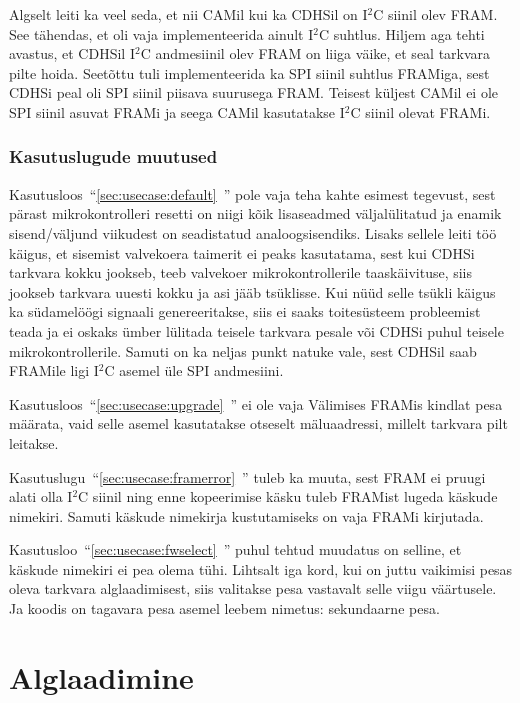 \documentclass[12pt,a4paper]{article}
\newcommand{\iic}{I${}^2$C }
\begin{document}
Algselt leiti ka veel seda, et nii CAMil kui ka CDHSil on \iic siinil olev FRAM.
See tähendas, et oli vaja implementeerida ainult \iic suhtlus. Hiljem aga tehti
avastus, et CDHSil \iic andmesiinil olev FRAM on liiga väike, et seal tarkvara
pilte hoida. Seetõttu tuli implementeerida ka SPI siinil suhtlus FRAMiga, sest
CDHSi peal oli SPI siinil piisava suurusega FRAM. Teisest küljest CAMil ei ole
SPI siinil asuvat FRAMi ja seega CAMil kasutatakse \iic siinil olevat FRAMi.

\subsubsection{Kasutuslugude muutused}
Kasutusloos~``\ref{sec:usecase:default}~'' pole vaja
teha kahte esimest tegevust, sest pärast mikrokontrolleri resetti on niigi kõik
lisaseadmed väljalülitatud ja enamik sisend/väljund viikudest on seadistatud
analoogsisendiks\cite{f1rm,f2rm}. Lisaks sellele leiti töö käigus, et sisemist
valvekoera taimerit ei peaks kasutatama, sest kui CDHSi tarkvara kokku jookseb,
teeb valvekoer mikrokontrollerile taaskäivituse, siis jookseb tarkvara uuesti
kokku ja asi jääb tsüklisse. Kui nüüd selle tsükli käigus ka südamelöögi
signaali genereeritakse, siis ei saaks toitesüsteem probleemist teada ja ei
oskaks ümber lülitada teisele tarkvara pesale või CDHSi puhul teisele
mikrokontrollerile. Samuti on ka neljas punkt natuke vale, sest CDHSil saab
FRAMile ligi \iic asemel üle SPI andmesiini.

Kasutusloos~``\ref{sec:usecase:upgrade}~'' ei ole vaja
Välimises FRAMis kindlat pesa määrata, vaid selle asemel kasutatakse otseselt
mäluaadressi, millelt tarkvara pilt leitakse. 

Kasutuslugu~``\ref{sec:usecase:framerror}~''
tuleb ka muuta, sest FRAM ei pruugi alati olla \iic siinil ning enne
kopeerimise käsku tuleb FRAMist lugeda käskude nimekiri. Samuti käskude
nimekirja kustutamiseks on vaja FRAMi kirjutada.

Kasutusloo~``\ref{sec:usecase:fwselect}~'' puhul
tehtud muudatus on selline, et käskude nimekiri ei pea olema tühi. Lihtsalt iga
kord, kui on juttu vaikimisi pesas oleva tarkvara alglaadimisest, siis valitakse
pesa vastavalt selle viigu väärtusele. Ja koodis on tagavara pesa asemel leebem
nimetus: sekundaarne pesa.

\section{Alglaadimine}
\label{sec:boot}
\end{document}
